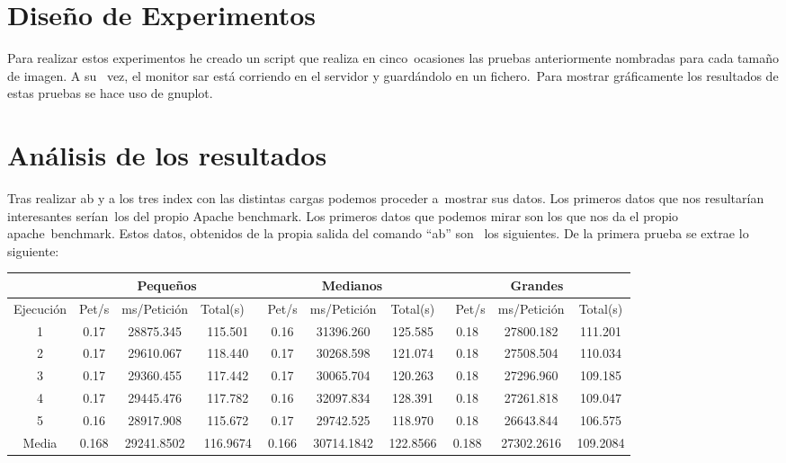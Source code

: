 \documentclass[11pt,twoside,a4paper]{book}
\begin{document}
\section{Diseño de Experimentos}
Para realizar estos experimentos he creado un script que realiza en cinco\
ocasiones las pruebas anteriormente nombradas para cada tamaño de imagen. A su \
vez, el monitor sar está corriendo en el servidor y guardándolo en un fichero.\
Para mostrar gráficamente los resultados de estas pruebas se hace uso de gnuplot.

\section{Análisis de los resultados}
Tras realizar ab y a los tres index con las distintas cargas podemos proceder a\
mostrar sus datos. Los primeros datos que nos resultarían interesantes serían\
los del propio Apache benchmark.
Los primeros datos que podemos mirar son los que nos da el propio apache\
benchmark. Estos datos, obtenidos de la propia salida del comando “ab” son \
los siguientes. De la primera prueba se extrae lo siguiente:

\begin{center}
\small
\begin{tabular}{ |c|c|c|c|c|c|c|c|c|c| }
 \hline
  & \multicolumn{3}{|c}{Pequeños} & \multicolumn{3}{|c|}{Medianos} & \multicolumn{3}{|c|}{Grandes} \\
 \hline
 Ejecución & Pet/s & ms/Petición & Total(s) \
 & Pet/s & ms/Petición & Total(s) &\
 Pet/s & ms/Petición & Total(s) \\
 \hline
 1 & 0.17 & 28875.345 & 115.501 & 0.16 & 31396.260 & 125.585 & 0.18 & 27800.182 & 111.201 \\
 \hline
 2 & 0.17 & 29610.067 & 118.440 & 0.17 & 30268.598 & 121.074 & 0.18 & 27508.504 & 110.034 \\
 \hline
 3 & 0.17 & 29360.455 & 117.442 & 0.17 & 30065.704 & 120.263 & 0.18 & 27296.960 & 109.185 \\
 \hline
 4 & 0.17 & 29445.476 & 117.782 & 0.16 & 32097.834 & 128.391 & 0.18 & 27261.818 & 109.047 \\
 \hline
 5 & 0.16 & 28917.908 & 115.672 & 0.17 & 29742.525 & 118.970 & 0.18 & 26643.844 & 106.575 \\
 \hline
 Media & 0.168 & 29241.8502 & 116.9674 & 0.166 & 30714.1842 & 122.8566 & 0.188 & 27302.2616 & 109.2084 \\
 \hline
\end{tabular}
\end{center}
\end{document}

